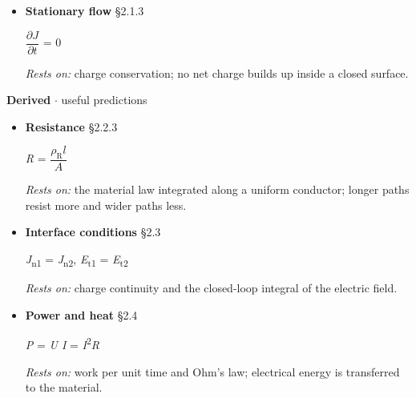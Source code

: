 \documentclass[11pt]{article}
\begin{document}
\begin{keepsection}
\begin{itemize}
\textit{J} = κ\textit{E}

\emph{Rests on:} the drift response of charge carriers; κ describes how strongly the material conducts.
\item {}
\textbf{Stationary flow} \hfill{\small\color{FAUblue}§2.1.3}

{\small\ensuremath{\dfrac{∂{J}}{∂{t}}}} = 0

\emph{Rests on:} charge conservation; no net charge builds up inside a closed surface.
\end{itemize}

\textbf{Derived} \ensuremath{\cdot} useful predictions

\begin{itemize}
\item {}
\textbf{Resistance} \hfill{\small\color{FAUblue}§2.2.3}

\textit{R} = {\small\ensuremath{\dfrac{ρ_{\mathrm{R}}{l}}{{A}}}}

\emph{Rests on:} the material law integrated along a uniform conductor; longer paths resist more and wider paths less.
\item {}
\textbf{Interface conditions} \hfill{\small\color{FAUblue}§2.3}

\textit{J}\textsubscript{n1} = \textit{J}\textsubscript{n2}, \textit{E}\textsubscript{t1} = \textit{E}\textsubscript{t2}

\emph{Rests on:} charge continuity and the closed-loop integral of the electric field.
\item {}
\textbf{Power and heat} \hfill{\small\color{FAUblue}§2.4}

\textit{P} = \textit{U I} = \textit{I}\textsuperscript{2}\textit{R}

\emph{Rests on:} work per unit time and Ohm's law; electrical energy is transferred to the material.
\end{itemize}


\end{keepsection}
\end{document}
